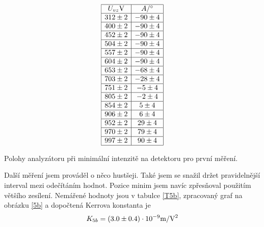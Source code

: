 \documentclass[a4paper,12pt]{article}
\begin{document}
\begin{table}
$$
\begin{array}{|c|c|}
\hline
U_{vz}\mbox{V}& A/^{\circ} \\ \hline
312 \pm 2 &   -90 \pm 4 \\ \hline
400 \pm 2 &   -90 \pm 4 \\ \hline
452 \pm 2 &   -90 \pm 4 \\ \hline
504 \pm 2 &   -90 \pm 4 \\ \hline
557 \pm 2 &   -90 \pm 4 \\ \hline
604 \pm 2 &   -90 \pm 4 \\ \hline
653 \pm 2 &   -68 \pm 4 \\ \hline
703 \pm 2 &   -28 \pm 4 \\ \hline
751 \pm 2 &   -5 \pm 4 \\ \hline
805 \pm 2 &   -2 \pm 4 \\ \hline
854 \pm 2 &   5 \pm 4 \\ \hline
906 \pm 2 &   6 \pm 4 \\ \hline
952 \pm 2 &   29 \pm 4 \\ \hline
970 \pm 2 &   79 \pm 4 \\ \hline
997 \pm 2 &   90 \pm 4 \\ \hline
\end{array}
$$
\caption{Polohy analyzátoru při minimální intenzitě na detektoru pro první měření.}
\label{T5a}
\end{table}

Další měření jsem prováděl o něco hustšeji. Také jsem se snažil držet pravidelnější interval mezi odečítáním hodnot. Pozice minim jsem navíc zpřesňoval použitím většího zesílení. Nemářené hodnoty jsou v tabulce \ref{T5b}, zpracovaný graf na obrázku \ref{5b} a dopočtená Kerrova konstanta je
\begin{eqnarray}
K_{5b}=(3.0\pm0.4) \cdot 10^{-9} \mbox{m}/\mbox{V}^2
\end{eqnarray}
\end{document}
